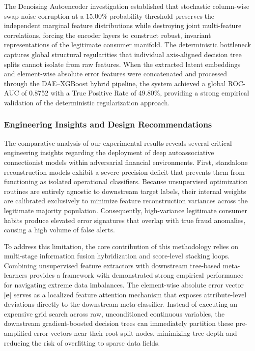 The Denoising Autoencoder investigation established that stochastic column-wise swap noise corruption at a 15.00\% probability threshold preserves the independent marginal feature distributions while destroying joint multi-feature correlations, forcing the encoder layers to construct robust, invariant representations of the legitimate consumer manifold. The deterministic bottleneck captures global structural regularities that individual axis-aligned decision tree splits cannot isolate from raw features. When the extracted latent embeddings and element-wise absolute error features were concatenated and processed through the DAE--XGBoost hybrid pipeline, the system achieved a global ROC-AUC of 0.8752 with a True Positive Rate of 49.80\%, providing a strong empirical validation of the deterministic regularization approach.

\subsubsection{Engineering Insights and Design Recommendations}

The comparative analysis of our experimental results reveals several critical engineering insights regarding the deployment of deep autoassociative connectionist models within adversarial financial environments. First, standalone reconstruction models exhibit a severe precision deficit that prevents them from functioning as isolated operational classifiers. Because unsupervised optimization routines are entirely agnostic to downstream target labels, their internal weights are calibrated exclusively to minimize feature reconstruction variances across the legitimate majority population. Consequently, high-variance legitimate consumer habits produce elevated error signatures that overlap with true fraud anomalies, causing a high volume of false alerts.

To address this limitation, the core contribution of this methodology relies on multi-stage information fusion hybridization and score-level stacking loops. Combining unsupervised feature extractors with downstream tree-based meta-learners provides a framework with demonstrated strong empirical performance for navigating extreme data imbalances. The element-wise absolute error vector $|\mathbf{e}|$ serves as a localized feature attention mechanism that exposes attribute-level deviations directly to the downstream meta-classifier. Instead of executing an expensive grid search across raw, unconditioned continuous variables, the downstream gradient-boosted decision trees can immediately partition these pre-amplified error vectors near their root split nodes, minimizing tree depth and reducing the risk of overfitting to sparse data fields.

